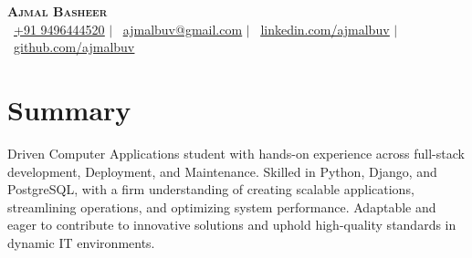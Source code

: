 \documentclass[a4paper,11pt]{article}
\begin{document}
	
	\begin{minipage}[c]{0.15\textwidth}
	\end{minipage}
	\begin{minipage}[t]{0.84\textwidth}  %
		\begin{center}
			{\selectfont \textbf{ \Huge \scshape Ajmal Basheer}} \\ \vspace{1pt}
			\small{
				\raisebox{-0.1\height}\faPhone\ \href{tel:+919496444520}{\underline{+91 9496444520}} $|$ 
				\raisebox{-0.2\height}\faEnvelope\ \href{mailto:ajmalbuv@gmail.com}{\underline{ajmalbuv@gmail.com}} $|$ 
				\raisebox{-0.2\height}\faLinkedin\ \href{https://linkedin.com/in/ajmalbuv}{\underline{linkedin.com/ajmalbuv}} $|$
				\raisebox{-0.2\height}\faGithub\ \href{https://github.com/ajmalbuv}{\underline{github.com/ajmalbuv}}
			}
		\end{center}
	\end{minipage}

\section{Summary}
\begin{itemize}[leftmargin=0.15in, label={}]
  \small{\item{
        Driven Computer Applications student with hands-on experience across full-stack development, Deployment, and Maintenance. Skilled in Python, Django, and PostgreSQL, with a firm understanding of creating scalable applications, streamlining operations, and optimizing system performance. Adaptable and eager to contribute to innovative solutions and uphold high-quality standards in dynamic IT environments.
        }}
\end{itemize}
\end{document}
